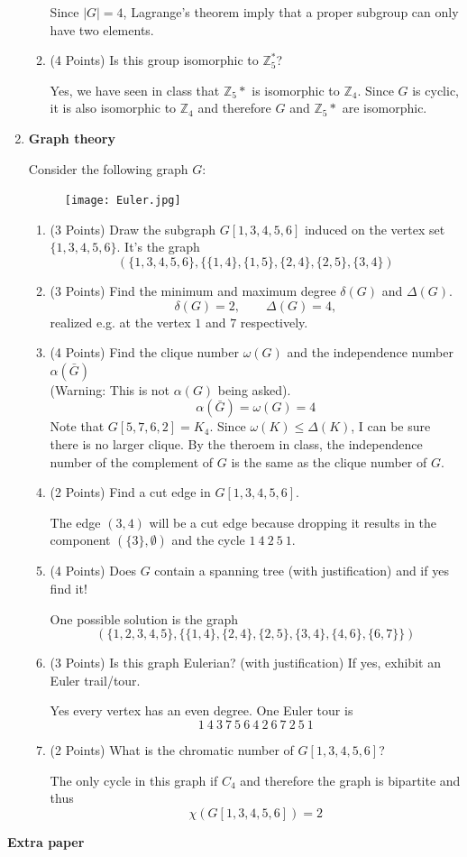 \documentclass[12pt]{article}
\begin{document}
\begin{enumerate}
\begin{enumerate}
Since $|G|=4$, Lagrange's theorem imply that a proper subgroup can only have two elements.
\item (4 Points) Is this group isomorphic to $\mathbb{Z}_5^*$?

Yes, we have seen in class that $\mathbb{Z}_5*$ is isomorphic to $\mathbb{Z}_4$. Since $G$ is cyclic, it is also isomorphic to $\mathbb{Z}_4$ and therefore $G$ and $\mathbb{Z}_5*$ are isomorphic.
\end{enumerate}

\newpage
\item \textbf{Graph theory}

Consider the following graph $G$:

\begin{figure}[h]
\centering
\texttt{[image: Euler.jpg]}
\end{figure}

\begin{enumerate}
\item (3 Points) Draw the subgraph $G[1,3,4,5,6]$ induced on the vertex set $\{1,3,4,5,6\}$.
It's the graph
\[
(\{1,3,4,5,6\},\{\{1,4\},\{1,5\},\{2,4\},\{2,5\},\{3,4\})
\]
\item (3 Points) Find the minimum and maximum degree $\delta(G)$ and $\Delta(G)$.
\[
\delta(G)=2,\qquad \Delta(G)=4,
\]
realized e.g. at the vertex $1$ and $7$ respectively.
\item (4 Points) Find the clique number $\omega(G)$ and the independence number $\alpha(\bar{G})$\\ (Warning: This is not $\alpha(G)$ being asked).
\[
\alpha(\bar{G})=\omega(G)=4
\]
Note that $G[5,7,6,2]=K_4$. Since $\omega(K)\leq\Delta(K)$, I can be sure there is no larger clique. By the theroem in class, the independence number of the complement of $G$ is the same as the clique number of $G$.

\item (2 Points) Find a cut edge in $G[1,3,4,5,6]$.

The edge $(3,4)$ will be a cut edge because dropping it results in the component $(\{3\},\emptyset)$ and the cycle $1~4~2~5~1$.
\item (4 Points) Does $G$ contain a spanning tree (with justification) and if yes find it!

One possible solution is the graph
\[
(\{1,2,3,4,5\},\{\{1,4\},\{2,4\},\{2,5\},\{3,4\},\{4,6\},\{6,7\}\})
\]
\item (3 Points) Is this graph Eulerian? (with justification) If yes, exhibit an Euler trail/tour.

Yes every vertex has an even degree. One Euler tour is 
\[
1~4~3~7~5~6~4~2~6~7~2~5~1
\]
\item (2 Points) What is the chromatic number of $G[1,3,4,5,6]$? 

The only cycle in this graph if $C_4$ and therefore the graph is bipartite and thus
\[
\chi(G[1,3,4,5,6])=2
\]
\end{enumerate}


\end{enumerate}

\newpage
\noindent
\textbf{Extra paper}
%

%
\end{document}
